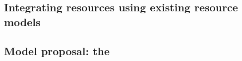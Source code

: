

\subsection{Integrating \texorpdfstring{}{INP} resources using existing resource models}


\subsection{Model proposal: the \texorpdfstring{}{extended-Tenant Application Graph}} \label{model_proposal}
